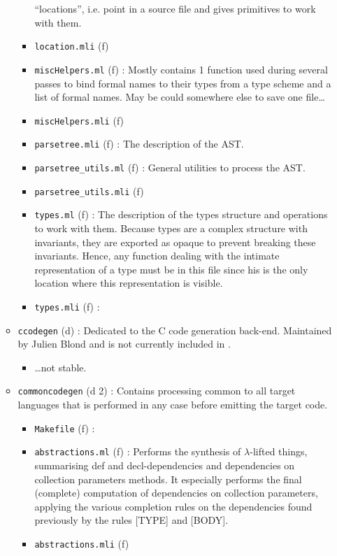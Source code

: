 \begin{itemize}
\begin{itemize}
\begin{itemize}
      ``locations'', i.e. point in a source file and gives
      primitives to work with them.
    \item {\tt location.mli} (f)
    \item {\tt miscHelpers.ml} (f) : Mostly contains 1 function
      used during several passes to bind formal names to their
      types from a type scheme and a list of formal names. May be
      could somewhere else to save one file\ldots
    \item {\tt miscHelpers.mli} (f)
    \item {\tt parsetree.mli} (f) : The description of the AST.
    \item {\tt parsetree\_utils.ml} (f) : General utilities to process
      the AST.
    \item {\tt parsetree\_utils.mli} (f)
    \item {\tt types.ml} (f) : The description of the types structure
      and operations to work with them. Because types are a complex
      structure with invariants, they are exported as opaque to
      prevent breaking these invariants. Hence, any function dealing
      with the intimate representation of a type must be in this file
      since his is the only location where this representation is visible.
    \item {\tt types.mli} (f) :
    \end{itemize}
  \item {\tt ccodegen} (d) : Dedicated to the C code generation
    back-end. Maintained by Julien Blond and is not currently included in
    \focalize.
    \begin{itemize}
    \item \ldots not stable.
    \end{itemize}
  \item {\tt commoncodegen} (d 2) : Contains processing common to all
    target languages that is performed in any case before emitting the
    target code.
    \begin{itemize}
    \item {\tt Makefile} (f) : 
    \item {\tt abstractions.ml} (f) : Performs the synthesis of
      $\lambda$-lifted things, summarising def and decl-dependencies
      and dependencies on collection parameters methods. It especially
      performs the final (complete) computation of dependencies on
      collection parameters, applying the various completion rules on
      the dependencies found previously by the rules [TYPE] and [BODY].
    \item {\tt abstractions.mli} (f)

\end{itemize}
\end{itemize}
\end{itemize}

